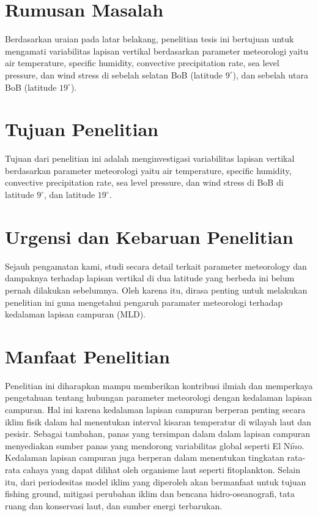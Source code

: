 \begin{spacing}{1.5}
	\section[Rumusan Masalah]{Rumusan Masalah}
	Berdasarkan uraian pada latar belakang, penelitian tesis ini bertujuan untuk mengamati variabilitas lapisan vertikal berdasarkan parameter meteorologi yaitu air temperature, specific humidity, convective precipitation rate, sea level pressure, dan wind stress di sebelah selatan BoB (latitude $9^\circ$), dan sebelah utara BoB (latitude $19^\circ$).
	
	\section[Tujuan Penelitian]{Tujuan Penelitian}
	
	Tujuan dari penelitian ini adalah menginvestigasi variabilitas lapisan vertikal berdasarkan parameter meteorologi yaitu air temperature, specific humidity, convective precipitation rate, sea level pressure, dan wind stress di BoB di latitude $9^\circ$, dan latitude $19^\circ$. 
	
	\section[Urgensi dan Kebaruan Penelitian]{Urgensi dan Kebaruan Penelitian}

	Sejauh pengamatan kami, studi secara detail terkait parameter meteorology dan dampaknya terhadap lapisan vertikal di dua latitude yang berbeda ini belum pernah dilakukan sebelumnya. Oleh karena itu, dirasa penting untuk melakukan penelitian ini guna mengetahui pengaruh paramater meteorologi terhadap kedalaman lapisan campuran (MLD).

	\section[Manfaat Penelitian]{Manfaat Penelitian}
	
	Penelitian ini diharapkan mampu memberikan kontribusi ilmiah dan memperkaya pengetahuan tentang hubungan parameter meteorologi dengan kedalaman lapisan campuran. Hal ini karena kedalaman lapisan campuran berperan penting secara iklim fisik dalam hal menentukan interval kisaran temperatur di wilayah laut dan pesisir. Sebagai tambahan, panas yang tersimpan dalam dalam lapisan campuran menyediakan sumber panas yang mendorong variabilitas global seperti El Ni$\tilde{n}$o. Kedalaman lapisan campuran juga berperan dalam menentukan tingkatan rata-rata cahaya yang dapat dilihat oleh organisme laut seperti fitoplankton. Selain itu, dari periodesitas model iklim yang diperoleh akan bermanfaat untuk tujuan fishing ground,	mitigasi perubahan iklim dan bencana hidro-oseanografi, tata ruang dan konservasi
	laut, dan sumber energi terbarukan. 


\end{spacing}
